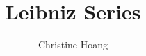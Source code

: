 \documentclass{article}
\title{Leibniz Series}
\author{Christine Hoang}
\begin{document}
\maketitle

\section{}
\end{document}
